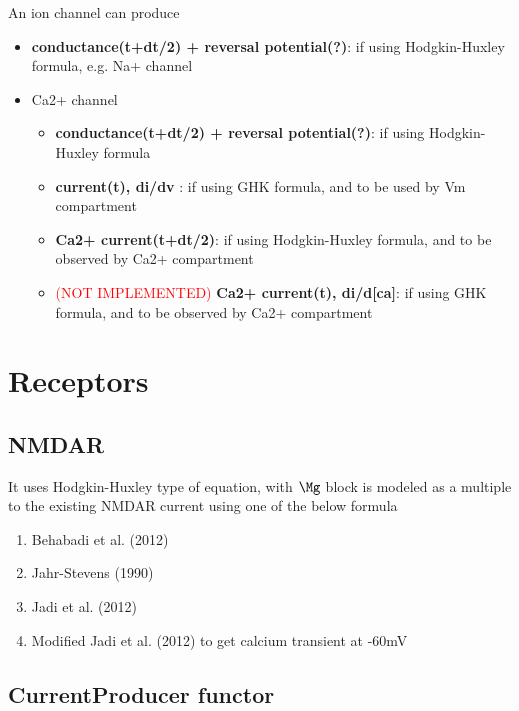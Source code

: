 An ion channel can produce
\begin{itemize}
  \item {\bf conductance(t+dt/2) + reversal potential(?)}:  if using
  Hodgkin-Huxley formula, e.g. Na+ channel
  
  
  \item Ca2+ channel
  \begin{itemize}
    \item {\bf conductance(t+dt/2) + reversal potential(?)}: if using
    Hodgkin-Huxley formula
  
    \item {\bf current(t), di/dv} : if using GHK formula, and to be used by Vm
    compartment

    \item {\bf Ca2+ current(t+dt/2)}: if using Hodgkin-Huxley formula, and to be
    observed by Ca2+ compartment

    \item \textcolor{red}{(NOT IMPLEMENTED)} {\bf Ca2+ current(t), di/d[ca]}: if
    using GHK formula, and to be observed by Ca2+ compartment
    
  \end{itemize}
  
\end{itemize}

\section{Receptors}
\label{sec:NTS-Receptors}

\subsection{NMDAR}
\label{sec:NTS-Receptors-NMDAR}

It uses Hodgkin-Huxley type of equation, with $\Mg$ block is modeled as a
multiple to the existing NMDAR current using one of the below formula
\begin{enumerate}
  \item Behabadi et al. (2012)
  \item Jahr-Stevens (1990)
  \item Jadi et al. (2012)
  \item Modified Jadi et al. (2012) to get calcium transient at -60mV
\end{enumerate}



\subsection{CurrentProducer functor}

